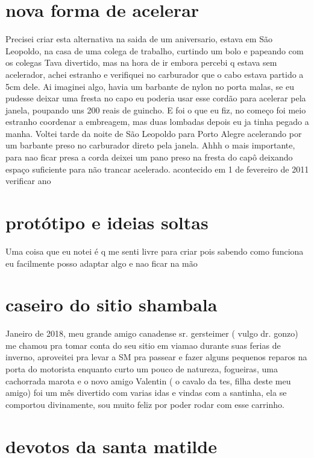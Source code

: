 \documentclass[a4paper]{report}
\begin{document}
\section*{nova forma de acelerar}

Precisei criar esta alternativa na saida de um aniversario, estava em S\~ao Leopoldo, na casa de uma colega de trabalho, curtindo um bolo e papeando com os colegas
Tava divertido, mas na hora de ir embora percebi q estava sem acelerador, achei estranho e verifiquei no carburador que o cabo estava partido a 5cm dele.
Ai imaginei algo, havia um barbante de nylon no porta malas, se eu pudesse deixar uma fresta no capo eu poderia usar esse cord\~ao para acelerar pela janela, poupando uns 200 reais de guincho.
E foi o que eu fiz, no come\c{c}o foi meio estranho coordenar a embreagem, mas duas lombadas depois eu ja tinha pegado a manha.
Voltei tarde da noite de S\~ao Leopoldo para Porto Alegre acelerando por um barbante preso no carburador direto pela janela.
Ahhh o mais importante, para nao ficar presa a corda deixei um pano preso na fresta do cap\^o deixando espa\c{c}o suficiente para n\~ao trancar acelerado. 
acontecido em 1 de fevereiro de 2011 verificar ano


\section*{prot\'otipo e ideias soltas}
Uma coisa que eu notei \'e q me senti livre para criar pois sabendo como funciona eu facilmente posso adaptar algo e nao ficar na m\~ao


\section*{caseiro do sitio shambala}


Janeiro de 2018, meu grande amigo canadense sr. gersteimer ( vulgo dr. gonzo) me chamou pra tomar conta do seu sitio em viamao durante suas ferias de inverno, aproveitei pra levar a SM pra passear e fazer alguns pequenos reparos na porta do motorista enquanto curto um pouco de natureza, fogueiras, uma cachorrada marota e o novo amigo Valentin ( o cavalo da tes, filha deste meu amigo) foi um m\^es divertido com varias idas e vindas com a santinha, ela se comportou divinamente, sou muito feliz por poder rodar com esse carrinho. 


\section*{devotos da santa matilde}
\end{document}
